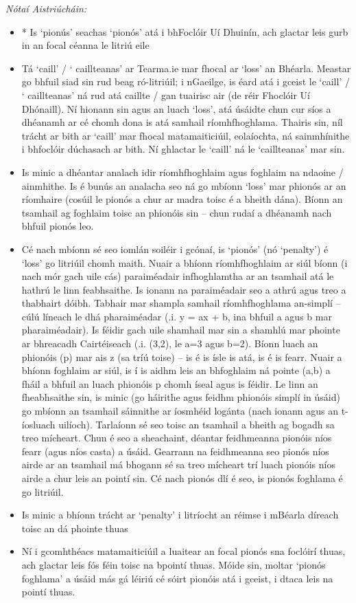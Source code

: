 \noindent \textit{Nótaí Aistriúcháin:}
\begin{itemize}
	\item * Is `pionús' seachas `pionós' atá i bhFoclóir Uí Dhuinín, ach glactar leis gurb in an focal céanna le litriú eile
	\item Tá `caill' / ` caillteanas' ar Tearma.ie mar fhocal ar `loss' an Bhéarla. Meastar go bhfuil siad sin rud beag ró-litriúil; i nGaeilge, is éard atá i gceist le `caill' / ` caillteanas' ná rud atá caillte / gan tuairisc air (de réir Fhoclóir Uí Dhónaill). Ní hionann sin agus an luach `loss', atá úsáidte chun cur síos a dhéanamh ar cé chomh dona is atá samhail ríomhfhoghlama. Thairis sin, níl trácht ar bith ar `caill' mar fhocal matamaiticiúil, eolaíochta, ná sainmhínithe i bhfoclóir dúchasach ar bith. Ní ghlactar le `caill' ná le `caillteanas' mar sin.
	\item Is minic a dhéantar analach idir ríomhfhoghlaim agus foghlaim na ndaoine / ainmhithe. Is é bunús an analacha seo ná go mbíonn `loss' mar phionós ar an ríomhaire (cosúil le pionós a chur ar madra toisc é a bheith dána). Bíonn an tsamhail ag foghlaim toisc an phionóis sin -- chun rudaí a dhéanamh nach bhfuil pionós leo.
	\item Cé nach mbíonn sé seo iomlán soiléir i gcónaí, is `pionós' (nó `penalty') é `loss' go litriúil chomh maith. Nuair a bhíonn ríomhfhoghlaim ar siúl bíonn (i nach mór gach uile cás) paraiméadair infhoghlamtha ar an tsamhail atá le hathrú le linn feabhsaithe. Is ionann na paraiméadair seo a athrú agus treo a thabhairt dóibh. Tabhair mar shampla samhail ríomhfhoghlama an-simplí -- cúlú líneach le dhá pharaiméadar (.i. y = ax + b, ina bhfuil a agus b mar pharaiméadair). Is féidir gach uile shamhail mar sin a shamhlú mar phointe ar bhreacadh Cairtéiseach (.i. (3,2), le a=3 agus b=2). Bíonn luach an phionóis (p) mar ais z (sa tríú toise) -- is é is ísle is atá, is é is fearr. Nuair a bhíonn foghlaim ar siúl, is í is aidhm leis an bhfoghlaim ná pointe (a,b) a fháil a bhfuil an luach phionóis p chomh íseal agus is féidir. Le linn an fheabhsaithe sin, is minic (go háirithe agus feidhm phionóis simplí in úsáid) go mbíonn an tsamhail sáinnithe ar íosmhéid logánta (nach ionann agus an t-íosluach uilíoch). Tarlaíonn sé seo toisc an tsamhail a bheith ag bogadh sa treo mícheart. Chun é seo a sheachaint, déantar feidhmeanna pionóis níos fearr (agus níos casta) a úsáid. Gearrann na feidhmeanna seo pionós níos airde ar an tsamhail má bhogann sé sa treo mícheart trí luach pionóis níos airde a chur leis an pointí sin. Cé nach pionós dlí é seo, is pionós foghlama é go litriúil.
	\item Is minic a bhíonn trácht ar `penalty' i litríocht an réimse i mBéarla díreach toisc an dá phointe thuas
	\item Ní i gcomhthéacs matamaiticiúil a luaitear an focal pionós sna foclóirí thuas, ach glactar leis fós féin toisc na bpointí thuas. Móide sin, moltar `pionós foghlama' a úsáid más gá léiriú cé sóirt pionóis atá i gceist, i dtaca leis na pointí thuas.
\end{itemize}


